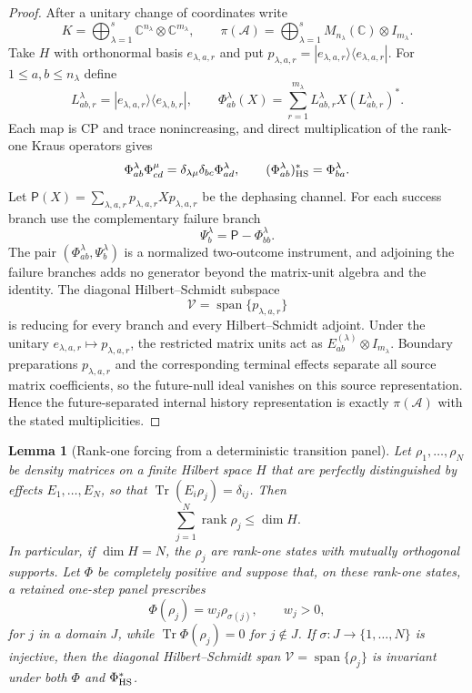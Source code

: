 \documentclass[11pt]{article}
\newtheorem{lemma}[lemma]{Lemma}
\theoremstyle{definition}
\theoremstyle{remark}
\theoremstyle{definition}
\theoremstyle{remark}
\newcommand{\C}{\mathbb C}
\newcommand{\Tr}{\operatorname{Tr}}
\newcommand{\rank}{\operatorname{rank}}
\newcommand{\Span}{\operatorname{span}}
\newcommand{\A}{\mathcal A}
\begin{document}
\begin{proof}
After a unitary change of coordinates write
\[
 K=\bigoplus_{\lambda=1}^s\C^{n_\lambda}\otimes\C^{m_\lambda},
 \qquad
 \pi(\A)=\bigoplus_{\lambda=1}^sM_{n_\lambda}(\C)\otimes I_{m_\lambda}.
\]
Take $H$ with orthonormal basis $e_{\lambda,a,r}$ and put
$p_{\lambda,a,r}=|e_{\lambda,a,r}\rangle\langle e_{\lambda,a,r}|$.  For
$1\le a,b\le n_\lambda$ define
\[
 L_{ab,r}^\lambda
 =|e_{\lambda,a,r}\rangle\langle e_{\lambda,b,r}|,
 \qquad
 \Phi_{ab}^\lambda(X)
 =\sum_{r=1}^{m_\lambda}L_{ab,r}^\lambda X(L_{ab,r}^\lambda)^*.
\]
Each map is CP and trace nonincreasing, and direct multiplication of the
rank-one Kraus operators gives
\[
 \Phi_{ab}^\lambda\Phi_{cd}^\mu
 =\delta_{\lambda\mu}\delta_{bc}\Phi_{ad}^\lambda,
 \qquad
 (\Phi_{ab}^\lambda)^*_{\rm HS}=\Phi_{ba}^\lambda.
\]
Let $\mathsf P(X)=\sum_{\lambda,a,r}p_{\lambda,a,r}Xp_{\lambda,a,r}$ be the
dephasing channel.  For each success branch use the complementary failure branch
\[
 \Psi_b^\lambda=\mathsf P-\Phi_{bb}^\lambda.
\]
The pair $(\Phi_{ab}^\lambda,\Psi_b^\lambda)$ is a normalized two-outcome
instrument, and adjoining the failure branches adds no generator beyond the
matrix-unit algebra and the identity.  The diagonal Hilbert--Schmidt subspace
\[
 \mathcal V=\operatorname{span}\{p_{\lambda,a,r}\}
\]
is reducing for every branch and every Hilbert--Schmidt adjoint.  Under the
unitary $e_{\lambda,a,r}\mapsto p_{\lambda,a,r}$, the restricted matrix units
act as
$E_{ab}^{(\lambda)}\otimes I_{m_\lambda}$.  Boundary preparations
$p_{\lambda,a,r}$ and the corresponding terminal effects separate all source
matrix coefficients, so the future-null ideal vanishes on this source
representation.  Hence the future-separated internal history representation is
exactly $\pi(\A)$ with the stated multiplicities.
\end{proof}

\begin{lemma}[Rank-one forcing from a deterministic transition panel]
\label{lem:ncg-rank-one-forcing}
Let $\rho_1,\ldots,\rho_N$ be density matrices on a finite Hilbert space $H$ that
are perfectly distinguished by effects $E_1,\ldots,E_N$, so that
$\Tr(E_i\rho_j)=\delta_{ij}$.  Then
\begin{equation}
 \sum_{j=1}^N\rank\rho_j\le\dim H.
 \label{eq:perfect-discrimination-rank}
\end{equation}
In particular, if $\dim H=N$, the $\rho_j$ are rank-one states with mutually
orthogonal supports.  Let $\Phi$ be completely positive and suppose that, on these
rank-one states, a retained one-step panel prescribes
\begin{equation}
 \Phi(\rho_j)=w_j\rho_{\sigma(j)},\qquad w_j>0,
 \label{eq:deterministic-panel-map}
\end{equation}
for $j$ in a domain $J$, while $\Tr\Phi(\rho_j)=0$ for $j\notin J$.  If
$\sigma:J\to\{1,\ldots,N\}$ is injective, then the diagonal Hilbert--Schmidt span
$\mathcal V=\Span\{\rho_j\}$ is invariant under both $\Phi$ and
$\Phi^*_{\rm HS}$.
\end{lemma}
\end{document}
